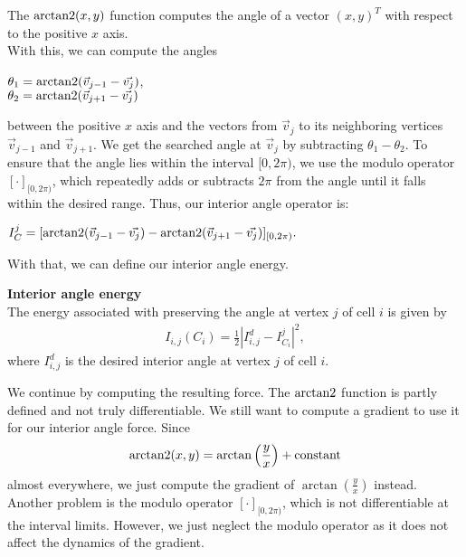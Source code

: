 The $\operatorname{arctan2}(x,y)$ function computes the angle of a vector $(x,y)^T$ with respect to the positive $x$ axis. \\
With this, we can compute the angles 
\begin{center}
	
	$\theta_1 = \operatorname{arctan2}( \vec{v}_{j-1} - \vec{v_j} )$, \\
	$\theta_2 = \operatorname{arctan2}( \vec{v}_{j+1} - \vec{v_j} )$
	
\end{center}
between the positive $x$ axis and the vectors from $\vec{v}_j$ to its neighboring vertices $\vec{v}_{j-1}$ and $\vec{v}_{j+1}$. 
We get the searched angle at $\vec{v}_j$ by subtracting $\theta_1 - \theta_2$.
To ensure that the angle lies within the interval $[0, 2\pi)$, we use the modulo operator $[ \cdot ]_{[0,2\pi)}$, which repeatedly adds or subtracts $2\pi$ from the angle until it falls within the desired range.
Thus, our interior angle operator is: 
\begin{center}
	$
	I^j_C = [\operatorname{arctan2}(\vec{v}_{j-1} - \vec{v_j}) - \operatorname{arctan2}(\vec{v}_{j+1} - \vec{v_j})]_{[0,2\pi)}.
	$
\end{center}

With that, we can define our interior angle energy. 
\begin{definition} \textbf{Interior angle energy} \\
	The energy associated with preserving the angle at vertex $j$ of cell $i$ is given by
	\begin{align*}
		I_{i, j}(C_i) = \frac{1}{2}| I_{i, j}^d - I^j_{C_i} |^2, 
	\end{align*}
	where $I_{i, j}^d$ is the desired interior angle at vertex $j$ of cell $i$. 
\end{definition}


We continue by computing the resulting force. 
The $\operatorname{arctan2}$ function is partly defined and not truly differentiable. 
We still want to compute a gradient to use it for our interior angle force. 
Since $$\operatorname{arctan2}(x,y) = \arctan\left(\frac{y}{x} \right) + \text{constant}$$ almost everywhere, we just compute the gradient of $\arctan(\frac{y}{x})$ instead. \\
Another problem is the modulo operator $[ \cdot ]_{[0,2\pi)}$, which is not differentiable at the interval limits.
However, we just neglect the modulo operator as it does not affect the dynamics of the gradient.

